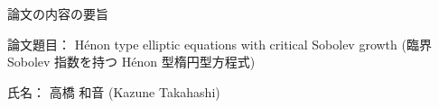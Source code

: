 \documentclass[lualatex, ja=standard]{bxjsarticle}
\theoremstyle{plain}
\theoremstyle{definition}
\theoremstyle{remark}
\begin{document}
\begin{center}
  {\Huge 論文の内容の要旨}
\end{center}
{\Large

\noindent 論文題目： Hénon type elliptic equations with critical Sobolev growth (臨界 Sobolev 指数を持つ Hénon 型楕円型方程式)

\noindent 氏名： 高橋 和音 (Kazune Takahashi)
}





\end{document}

